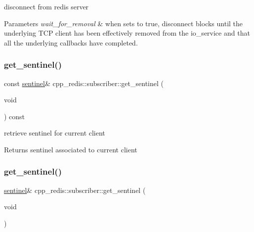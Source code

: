 disconnect from redis server


\begin{DoxyParams}{Parameters}
{\em wait\+\_\+for\+\_\+removal} & when sets to true, disconnect blocks until the underlying T\+CP client has been effectively removed from the io\+\_\+service and that all the underlying callbacks have completed. \\
\hline
\end{DoxyParams}
\mbox{\label{classcpp__redis_1_1subscriber_a55a8906106adceca1faf6ab26e040f8a}} 
\subsubsection{\texorpdfstring{get\+\_\+sentinel()}{get\_sentinel()}\hspace{0.1cm}{\footnotesize\ttfamily [1/2]}}
{\footnotesize\ttfamily const \hyperlink{classcpp__redis_1_1sentinel}{sentinel}\& cpp\+\_\+redis\+::subscriber\+::get\+\_\+sentinel (\begin{DoxyParamCaption}\item[{void}]{ }\end{DoxyParamCaption}) const}

retrieve sentinel for current client

\begin{DoxyReturn}{Returns}
sentinel associated to current client 
\end{DoxyReturn}
\mbox{\label{classcpp__redis_1_1subscriber_ae883ef7e41753d5c1d819260d7574e4b}} 
\subsubsection{\texorpdfstring{get\+\_\+sentinel()}{get\_sentinel()}\hspace{0.1cm}{\footnotesize\ttfamily [2/2]}}
{\footnotesize\ttfamily \hyperlink{classcpp__redis_1_1sentinel}{sentinel}\& cpp\+\_\+redis\+::subscriber\+::get\+\_\+sentinel (\begin{DoxyParamCaption}\item[{void}]{ }\end{DoxyParamCaption})}

